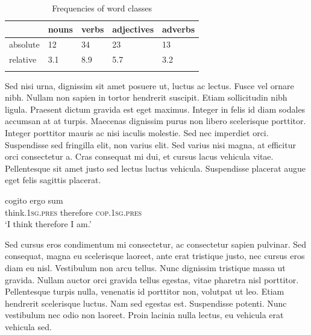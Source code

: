 \documentclass[output=paper]{langscibook}
\begin{document}














\iffalse

\begin{table}
\caption{Frequencies of word classes}
\label{gri-ric:tab:1:frequencies}
 \begin{tabular}{lllll} 
  \lsptoprule
            & nouns & verbs & adjectives & adverbs\\ 
  \midrule
  absolute  &   12 &    34  &    23     & 13\\
  relative  &   3.1 &   8.9 &    5.7    & 3.2\\
  \lspbottomrule
 \end{tabular}
\end{table}

Sed nisi urna, dignissim sit amet posuere ut, luctus ac lectus. Fusce vel ornare nibh. Nullam non sapien in tortor hendrerit suscipit. Etiam sollicitudin nibh ligula. Praesent dictum gravida est eget maximus. Integer in felis id diam sodales accumsan at at turpis. Maecenas dignissim purus non libero scelerisque porttitor. Integer porttitor mauris ac nisi iaculis molestie. Sed nec imperdiet orci. Suspendisse sed fringilla elit, non varius elit. Sed varius nisi magna, at efficitur orci consectetur a. Cras consequat mi dui, et cursus lacus vehicula vitae. Pellentesque sit amet justo sed lectus luctus vehicula. Suspendisse placerat augue eget felis sagittis placerat. 

\ea
\gll cogito ergo sum\\  
     think.\textsc{1sg}.\textsc{pres} therefore \textsc{cop}.\textsc{1sg}.\textsc{pres}\\ 
\glt `I think therefore I am.'
\z

Sed cursus eros condimentum mi consectetur, ac consectetur sapien pulvinar. Sed consequat, magna eu scelerisque laoreet, ante erat tristique justo, nec cursus eros diam eu nisl. Vestibulum non arcu tellus. Nunc dignissim tristique massa ut gravida. Nullam auctor orci gravida tellus egestas, vitae pharetra nisl porttitor. Pellentesque turpis nulla, venenatis id porttitor non, volutpat ut leo. Etiam hendrerit scelerisque luctus. Nam sed egestas est. Suspendisse potenti. Nunc vestibulum nec odio non laoreet. Proin lacinia nulla lectus, eu vehicula erat vehicula sed. 
\end{document}

